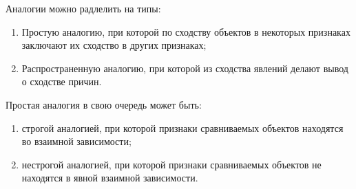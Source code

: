 Аналогии можно радлелить на типы:
\begin{enumerate}
  \item Простую аналогию, при которой по сходству объектов в некоторых
    признаках заключают их сходство в других признаках;

  \item Распространенную аналогию, при которой из сходства явлений делают вывод о
    сходстве причин.
\end{enumerate}
Простая аналогия в свою очередь может быть:
\begin{enumerate}
  \item строгой аналогией, при которой признаки сравниваемых объектов находятся
    во взаимной зависимости;
  \item нестрогой аналогией, при которой признаки сравниваемых объектов не
    находятся в явной взаимной зависимости.
\end{enumerate}
